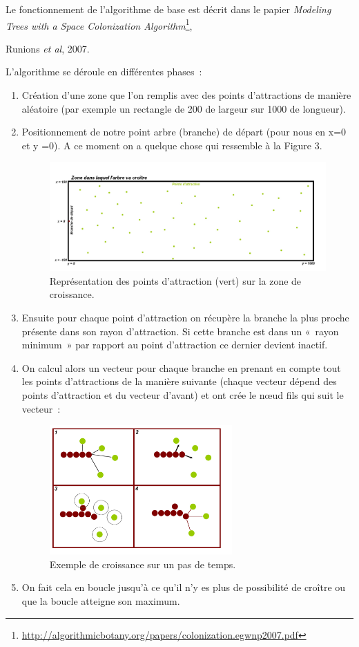 \documentclass[a4paper]{article}
\begin{document}
		Le fonctionnement de l’algorithme de base est décrit dans le papier \emph{Modeling Trees with a Space Colonization Algorithm}\footnote{\url{http://algorithmicbotany.org/papers/colonization.egwnp2007.pdf}}, {Runions \emph{et al}, 2007.
	
		L’algorithme se déroule en différentes  phases :
		\begin{enumerate}
			\item Création d’une zone que l’on remplis avec des points d’attractions de manière aléatoire (par exemple un rectangle de 200 de largeur sur 1000 de longueur). 
			\newpage
			\item Positionnement de notre point arbre (branche) de départ (pour nous en x=0 et y =0).
			A ce moment on a quelque chose qui ressemble à la Figure 3.
			\begin{figure}[!h]
				\centering
				\includegraphics[width=11cm]{./img/sc.jpg}
				\caption{Représentation des points d'attraction (vert) sur la zone de croissance.}
			\end{figure}
			\item Ensuite pour chaque point d’attraction on récupère la branche la plus proche présente dans son rayon d’attraction. Si cette branche est dans un « rayon minimum » par rapport au point d’attraction ce dernier devient inactif.

			\item On calcul alors un vecteur pour chaque branche en prenant en compte tout les points d’attractions de la manière suivante (chaque vecteur dépend des points d’attraction et du vecteur d’avant) et ont crée le nœud fils qui suit le vecteur : 
			\begin{figure}[!h]
				\centering
				\includegraphics[width=7cm]{./img/sc2.jpg}
				\caption{Exemple de croissance sur un pas de temps.}
			\end{figure}
			\item On fait cela en boucle jusqu’à ce qu’il n’y es plus de possibilité de croître ou que la boucle atteigne son maximum.
		\end{enumerate}


}
\end{document}
